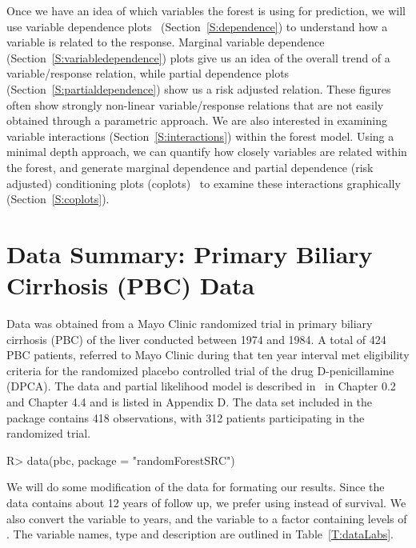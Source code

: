 \documentclass[nojss]{jss}\usepackage[]{graphicx}\usepackage[]{color}
\begin{document}
Once we have an idea of which variables the forest is using for prediction, we will use variable dependence plots~\citep{Friedman:2000} (Section~\ref{S:dependence}) to understand how a variable is related to the response. Marginal variable dependence (Section~\ref{S:variabledependence}) plots give us an idea of the overall trend of a variable/response relation, while partial dependence plots (Section~\ref{S:partialdependence}) show us a risk adjusted relation. These figures often show strongly non-linear variable/response relations that are not easily obtained through a parametric approach. We are also interested in examining variable interactions (Section~\ref{S:interactions}) within the forest model. Using a minimal depth approach, we can quantify how closely variables are related within the forest, and generate marginal dependence and partial dependence (risk adjusted) conditioning plots (coplots)~\citep{chambers:1992,cleveland:1993} to examine these interactions graphically  (Section~\ref{S:coplots}).

\section{Data Summary: Primary Biliary Cirrhosis (PBC) Data}\label{S:data}

Data was obtained from a Mayo Clinic randomized trial in primary biliary cirrhosis (PBC) of the liver conducted between 1974 and 1984. A total of 424 PBC patients, referred to Mayo Clinic during that ten year interval met eligibility criteria for the randomized placebo controlled trial of the drug D-penicillamine (DPCA). The data and partial likelihood model is described in~\cite{fleming:1991} in Chapter 0.2 and Chapter 4.4 and is listed in Appendix D. The  data set included in the  package contains 418 observations, with 312 patients participating in the randomized trial.

\begin{Schunk}
\begin{Sinput}
R> data(pbc, package = "randomForestSRC")
\end{Sinput}
\end{Schunk}



We will do some modification of the data for formating our results. Since the data contains about 12 years of follow up, we prefer using  instead of  survival. We also convert the  variable to years, and the  variable to a factor containing levels of . The variable names, type and description are outlined in Table~\ref{T:dataLabs}.
\end{document}
